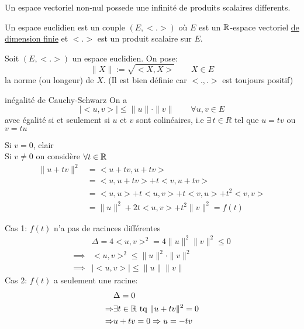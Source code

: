 \documentclass[a4paper]{report}
\begin{document}
\begin{prop}
    Un espace vectoriel non-nul possede une infinité de produits scalaires differents.   
\end{prop} 

\begin{definition}
    Un espace euclidien est un couple $(E, < . >)$ où $E$ est un  $\mathbb{R}$-espace vectoriel \underline{de dimension finie} et  $< . >$ est un produit scalaire sur  $E$.
\end{definition}
\begin{property} Soit $(E, < . >)$ un espace euclidien. On pose:
    \[
    \|X\| := \sqrt{<X,X>} \qquad X \in E 
    \] 
    la norme (ou longeur) de $X$. (Il est bien définie car $<., .>$ est toujours positif)
\end{property}
\begin{lemma} inégalité de Cauchy-Schwarz
   On a
   \[
   |<u, v>| \le \|u\| \cdot \|v\| \qquad \forall u, v \in E
   \] 
   avec égalité si et seulement si $u$ et  $v$ sont colinéaires, i.e  $\exists \, t \in R$ tel que $u = tv$ ou  $v = tu$
\end{lemma}
\begin{explanation}
   Si $v = 0$, clair\\
   Si $v \neq 0$ on considère $\forall t \in \mathbb{R}$
   \begin{align*}
       \|u + tv\|^2 &= <u + tv, u + tv>\\ 
                    &= <u, u + tv> + t<v, u + tv>\\
                    &= <u, u> + t<u, v> + t<v, u> + t^2<v, v>\\
                    &= \|u\|^2 + 2t<u, v> + t^2 \|v\|^2 = f(t)
   \end{align*}
   \begin{center}
   \end{center}
Cas 1: $f(t)$ n'a pas de racinces différentes
\begin{align*}
    &\Delta = 4<u, v>^2 = 4\|u\|^2\|v\|^2 \le 0\\
    \implies & <u, v>^2 \le \|u\|^2 \cdot \|v\|^2\\
    \implies & |<u, v>| \le \|u\|\|v\|
\end{align*}
Cas 2: $f(t)$ a seulement une racine:\\
\begin{align*}
    &\Delta = 0\\
    \Rightarrow & \exists t \in \mathbb{R} \text{ tq } \|u + tv\|^2 = 0\\
    \Rightarrow &u + tv = 0 \Rightarrow u = -tv
\end{align*}
\end{explanation}
\end{document}
